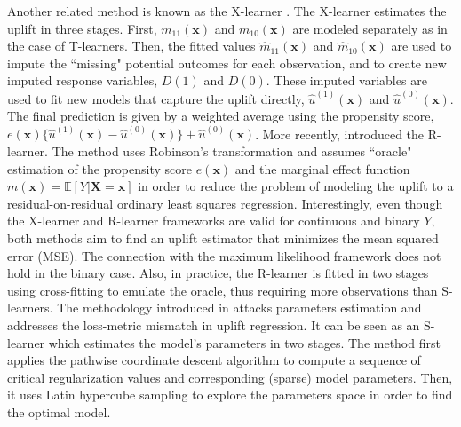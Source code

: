 \documentclass{article}
\def\x{\mathbf x}
\begin{document}
Another related method is known as the X-learner \citep{kunzel2019metalearners}. The X-learner estimates the uplift in three stages. First, $m_{11}(\x)$ and $m_{10}(\x)$ are modeled separately as in the case of T-learners. Then, the fitted values $\hat m_{11}(\x)$ and $\hat m_{10}(\x)$ are used to impute the ``missing" potential outcomes for each observation, and to create new imputed response variables, $D(1)$ and $D(0)$. These imputed variables are used to fit new models that capture the uplift directly, $\hat u^{(1)}(\x)$ and $\hat u^{(0)}(\x)$. The final prediction is given by a weighted average using the propensity score, $e(\x)\{\hat u^{(1)}(\x) - \hat u^{(0)}(\x)\} + \hat u^{(0)}(\x)$. More recently, \cite{NieWager2020Quasi} introduced the R-learner. The method uses Robinson's transformation \citep{robinson1988root} and assumes ``oracle" estimation of the propensity score $e(\x)$ and the marginal effect function $m(\x) = \mathbb{E}[Y|\boldsymbol X=\x]$ in order to reduce the problem of modeling the uplift to a residual-on-residual ordinary least squares regression.  Interestingly, even though the X-learner and R-learner frameworks are valid for continuous and binary $ Y $, both methods aim to find an uplift estimator that minimizes the mean squared error (MSE). The connection with the maximum likelihood  framework does not hold in the binary case. Also, in practice, the R-learner is fitted in two stages using cross-fitting to emulate the oracle, thus requiring more observations than S-learners. %
The methodology introduced in \cite{belba2019qbased} attacks parameters estimation and addresses the loss-metric mismatch in uplift regression. It can be seen as an S-learner which estimates the model's parameters in two stages. The method first applies the pathwise coordinate descent algorithm \citep{friedman2007pathwise} to compute a sequence of critical regularization values and corresponding (sparse) model parameters. Then, it uses Latin hypercube sampling \citep{mckay2000comparison} to explore the parameters space in order to find the optimal model.
\end{document}
